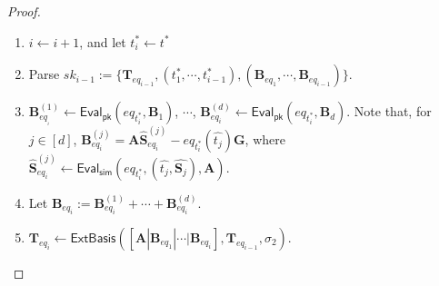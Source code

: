 \documentclass[runningheads,10pt]{llncs}
\begin{document}
\begin{proof}
\begin{description}
\begin{enumerate}
\begin{enumerate}
				\iffalse
				\begin{enumerate}
					\item $i \leftarrow i+1$, and let $t^*_i\leftarrow t^*$
					\item Parse $sk_{i-1}:=\{\textbf{T}_{eq_{i-1}},(t^*_1,\cdots, t^*_{i-1}), (\textbf{B}_{eq_{1}}, \cdots, \textbf{B}_{eq_{i-1}})\}$.
					\item $\textbf{B}_{eq_{_i}}^{(1)} \leftarrow \textsf{Eval}_\textsf{pk}(eq_{t^*_i}, \textbf{B}_1)$, $\cdots$, $\textbf{B}_{eq_{i}}^{(d)} \leftarrow \textsf{Eval}_\textsf{pk}(eq_{t^*_{i}}, \textbf{B}_d)$. Note that, for $j \in [d]$,  $\textbf{B}_{eq_{i}}^{(j)}=\textbf{A}\widehat{\textbf{S}}_{eq_i}^{(j)}-eq_{t^*_i}(\widehat{t_j})\textbf{G}$, where  $\widehat{\textbf{S}}_{eq_i}^{(j)} \leftarrow \textsf{Eval}_\textsf{sim}(eq_{t^*_i}, (\widehat{t_j},\widehat{\textbf{S}_j}), \textbf{A})$.
					
					\item Let $\textbf{B}_{eq_{i}}:=\textbf{B}_{eq_{i}}^{(1)}+\cdots+\textbf{B}_{eq_{i}}^{(d)}$.
					\item $\textbf{T}_{eq_{i}} \leftarrow \textsf{ExtBasis}([\textbf{A} |\textbf{B}_{eq_{1}}|\cdots |\textbf{B}_{eq_{{i}}}], \textbf{T}_{eq_{{i-1}}}, \sigma_2)$.
					

\end{enumerate}
\end{enumerate}
\end{enumerate}
\end{description}
\end{proof}
\end{document}
